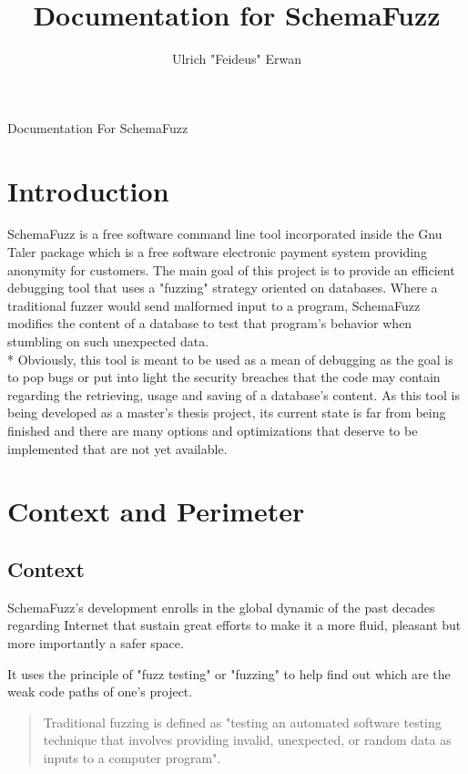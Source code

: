 \documentclass{article}
\title{Documentation for SchemaFuzz}
\author{Ulrich "Feideus" Erwan}
\begin{document}
\begin{empfile}
	
\maketitle Documentation For SchemaFuzz
\clearpage

\tableofcontents


	\section{Introduction} 
	
SchemaFuzz is a free software command line tool incorporated inside the Gnu Taler package 
which is a free software electronic payment system providing anonymity for customers.
The main goal of this project is to provide an efficient debugging tool that uses a "fuzzing" strategy oriented on databases.  
Where a traditional fuzzer would send malformed input to a program, SchemaFuzz modifies the content of a database to test that program's behavior when stumbling on such unexpected data. \\*
Obviously, this tool is meant to be used as a mean of debugging as the goal is to pop bugs or put into light the security breaches that the code may contain regarding the retrieving, usage and saving of a database's content.
As this tool is being developed as a master's thesis project, its current state is far from being finished and there are many options and optimizations that deserve to be implemented that are not yet available.

	\clearpage

	
	\section{Context and Perimeter} 
		\subsection{Context}
SchemaFuzz's development enrolls in the global dynamic of the past decades regarding Internet  that sustain great efforts to make it a more fluid, pleasant but more importantly a safer space.

It uses the principle of "fuzz testing" or "fuzzing" to help find out which are the weak code paths of one's project. 
				\begin{quotation}
Traditional fuzzing is defined as "testing an automated software testing technique that involves providing invalid, unexpected, or random data as inputs to a computer program".
				\end{quotation} 
				\cite{fuzzing}		




\end{empfile}
\end{document}

